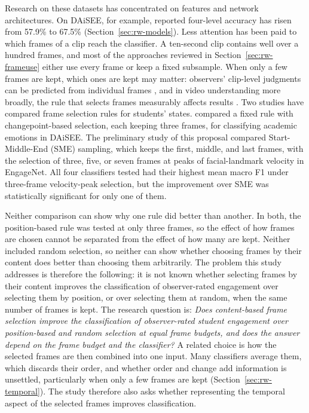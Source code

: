 Research on these datasets has concentrated on features and network architectures. On DAiSEE, for example, reported four-level accuracy has risen from 57.9\% to 67.5\% (Section~\ref{sec:rw-models}). Less attention has been paid to which frames of a clip reach the classifier. A ten-second clip contains well over a hundred frames, and most of the approaches reviewed in Section~\ref{sec:rw-frameuse} either use every frame or keep a fixed subsample. When only a few frames are kept, which ones are kept may matter: observers' clip-level judgments can be predicted from individual frames \cite{whitehill2014}, and in video understanding more broadly, the rule that selects frames measurably affects results \cite{korbar2019,brkic2025}. Two studies have compared frame selection rules for students' states.  compared a fixed rule with changepoint-based selection, each keeping three frames, for classifying academic emotions in DAiSEE. The preliminary study of this proposal \cite{sityar2026icce} compared Start-Middle-End (SME) sampling, which keeps the first, middle, and last frames, with the selection of three, five, or seven frames at peaks of facial-landmark velocity in EngageNet. All four classifiers tested had their highest mean macro F1 under three-frame velocity-peak selection, but the improvement over SME was statistically significant for only one of them.

Neither comparison can show why one rule did better than another. In both, the position-based rule was tested at only three frames, so the effect of how frames are chosen cannot be separated from the effect of how many are kept. Neither included random selection, so neither can show whether choosing frames by their content does better than choosing them arbitrarily. The problem this study addresses is therefore the following: it is not known whether selecting frames by their content improves the classification of observer-rated engagement over selecting them by position, or over selecting them at random, when the same number of frames is kept. The research question is: \emph{Does content-based frame selection improve the classification of observer-rated student engagement over position-based and random selection at equal frame budgets, and does the answer depend on the frame budget and the classifier?} A related choice is how the selected frames are then combined into one input. Many classifiers average them, which discards their order, and whether order and change add information is unsettled, particularly when only a few frames are kept (Section~\ref{sec:rw-temporal}). The study therefore also asks whether representing the temporal aspect of the selected frames improves classification.


